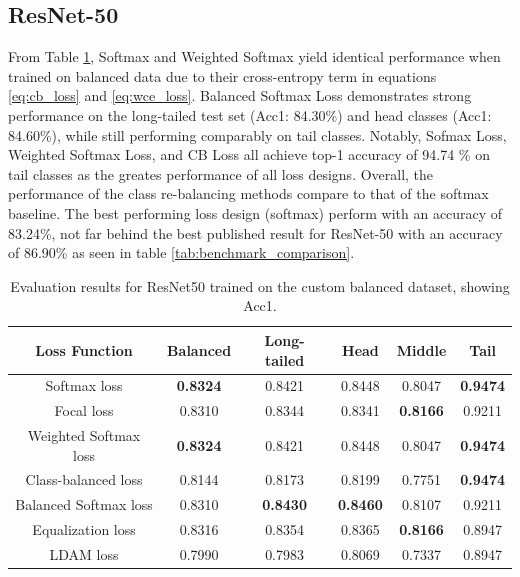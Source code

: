\subsection{ResNet-50}

From Table \ref{tab:resnet_bal_acc1_1}, Softmax and Weighted Softmax yield identical performance when trained on balanced data due to their cross-entropy term in equations \eqref{eq:cb_loss} and \eqref{eq:wce_loss}. Balanced Softmax Loss demonstrates strong performance on the long-tailed test set (Acc1: 84.30\%) and head classes (Acc1: 84.60\%), while still performing comparably on tail classes. Notably, Sofmax Loss, Weighted Softmax Loss, and CB Loss all achieve top-1 accuracy of 94.74 \% on tail classes as the greates performance of all loss designs. Overall, the performance of the class re-balancing methods compare to that of the softmax baseline. The best performing loss design (softmax) perform with an accuracy of 83.24\%, not far behind the best published result for ResNet-50 with an accuracy of 86.90\% as seen in table \ref{tab:benchmark_comparison}.

\begin{table}[h!]
    \centering
    \caption{Evaluation results for ResNet50 trained on the custom balanced dataset, showing Acc1.}
    \small
    \begin{tabular}{cccccc}
        \toprule
        Loss Function & Balanced & Long-tailed & Head & Middle & Tail \\ 
        \midrule
        Softmax loss   & \textbf{0.8324}  & 0.8421 & 0.8448 & 0.8047 & \textbf{0.9474} \\
        Focal loss   & 0.8310  & 0.8344 & 0.8341 & \textbf{0.8166} & 0.9211 \\
        Weighted Softmax loss   & \textbf{0.8324} & 0.8421 & 0.8448 & 0.8047 & \textbf{0.9474} \\
        Class-balanced loss   &  0.8144 & 0.8173 & 0.8199 & 0.7751 & \textbf{0.9474} \\
        Balanced Softmax loss   & 0.8310 & \textbf{0.8430} & \textbf{0.8460} & 0.8107 & 0.9211 \\
        Equalization loss   & 0.8316 & 0.8354 & 0.8365 & \textbf{0.8166} & 0.8947 \\
        LDAM loss   & 0.7990 & 0.7983 & 0.8069 & 0.7337 & 0.8947 \\
        \bottomrule
    \end{tabular}
    \label{tab:resnet_bal_acc1_1}
\end{table}

